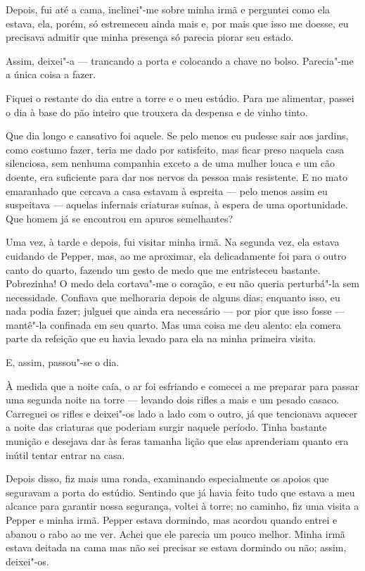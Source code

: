 Depois, fui até a cama, inclinei"-me sobre minha irmã e perguntei como ela estava, ela, porém, só estremeceu ainda mais e,
por mais que isso me doesse, eu precisava admitir que minha presença só parecia piorar seu estado.

Assim, deixei"-a --- trancando a porta e colocando a chave no bolso. Parecia"-me a única coisa a fazer.

Fiquei o restante do dia entre a torre e o meu estúdio. Para me alimentar, passei o dia à base do pão inteiro que
trouxera da despensa e de vinho tinto.

Que dia longo e cansativo foi aquele. Se pelo menos eu pudesse sair aos jardins, como costumo fazer, teria me dado por
satisfeito, mas ficar preso naquela casa silenciosa, sem nenhuma companhia exceto a de uma mulher louca e um cão
doente, era suficiente para dar nos nervos da pessoa mais resistente. E no mato emaranhado que cercava a casa estavam à
espreita --- pelo menos assim eu suspeitava --- aquelas infernais criaturas suínas, à espera de uma oportunidade. Que homem
já se encontrou em apuros semelhantes?

Uma vez, à tarde e depois, fui visitar minha irmã. Na segunda vez, ela estava cuidando de Pepper, mas, ao me
aproximar, ela delicadamente foi para o outro canto do quarto, fazendo um gesto de medo que me entristeceu bastante.
Pobrezinha! O medo dela cortava"-me o coração, e eu não queria perturbá"-la sem necessidade. Confiava que melhoraria
depois de alguns dias; enquanto isso, eu nada podia fazer; julguei que ainda era necessário --- por pior que isso fosse ---
mantê"-la confinada em seu quarto. Mas uma coisa me deu alento: ela comera parte da refeição que eu havia levado para
ela na minha primeira visita.

E, assim, passou"-se o dia.

À medida que a noite caía, o ar foi esfriando e comecei a me preparar para passar uma segunda noite na torre --- levando
dois rifles a mais e um pesado casaco. Carreguei os rifles e deixei"-os lado a lado com o outro, já que tencionava
aquecer a noite das criaturas que poderiam surgir naquele período. Tinha bastante munição e desejava dar às feras
tamanha lição que elas aprenderiam quanto era inútil tentar entrar na casa.

Depois disso, fiz mais uma ronda, examinando especialmente os apoios que seguravam a porta do estúdio. Sentindo que já
havia feito tudo que estava a meu alcance para garantir nossa segurança, voltei à torre; no caminho, fiz uma visita a
Pepper e minha irmã. Pepper estava dormindo, mas acordou quando entrei e abanou o rabo ao me ver. Achei que ele
parecia um pouco melhor. Minha irmã estava deitada na cama mas não sei precisar se estava dormindo ou não; assim,
deixei"-os.

